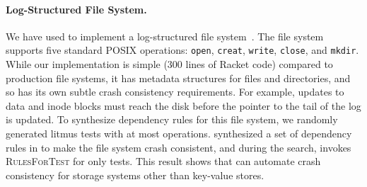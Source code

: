 \paragraph{Log-Structured File System.}
We have used \depsynth
to implement a log-structured file system~\cite{rosenblum:lfs}.
The file system supports five standard POSIX operations:
\texttt{open}, \texttt{creat}, \texttt{write}, \texttt{close}, and \texttt{mkdir}.
While our implementation is simple (300 lines of Racket code) compared to production file systems,
it has metadata structures for files and directories,
and so has its own subtle crash consistency requirements.
For example, updates to data and inode blocks must reach the
disk before the pointer to the tail of the log is updated.
To synthesize dependency rules for this file system,
we randomly generated \lfsinputtests{} litmus tests
with at most \lfsmaxops{} operations.
\depsynth synthesized a set of \lfsnumrules{} dependency rules
in \lfssynthesistime{} to make the file system crash consistent,
and during the search,
invokes \textsc{RulesForTest} for only \lfstestsused{} tests.
This result shows that \depsynth can automate crash consistency for storage systems other than key-value stores.
